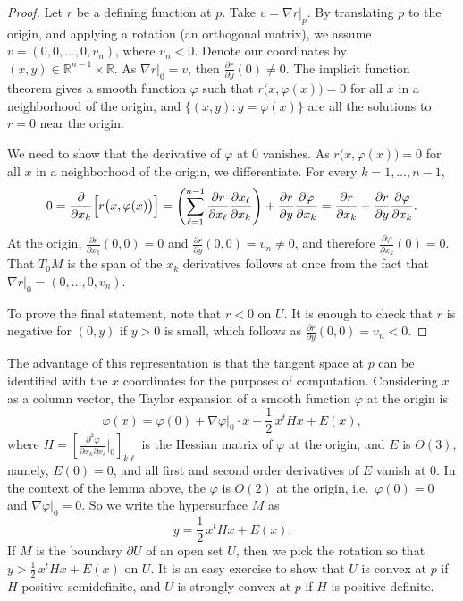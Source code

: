 \documentclass[12pt,openany]{book}
\newcommand{\avoidbreak}{\postdisplaypenalty=100}
\newcommand{\R}{{\mathbb{R}}}
\theoremstyle{plain}
\theoremstyle{remark}
\theoremstyle{definition}
\theoremstyle{exercise}
\theoremstyle{example}
\begin{document}
\begin{proof}
Let $r$ be a defining function at $p$.  Take $v = \nabla r|_p$.
By translating $p$ to the origin, and applying a rotation (an orthogonal matrix),
we assume $v = (0,0,\ldots,0,v_n)$, where $v_n < 0$.  Denote our
coordinates by $(x,y) \in \R^{n-1} \times \R$.  As $\nabla r|_0 =
v$, then $\frac{\partial r}{\partial y}(0) \not= 0$.
The implicit function theorem gives a
smooth function $\varphi$ such that
$r\bigl(x,\varphi(x)\bigr) = 0$ for all $x$ in a neighborhood of the
origin, and $\bigl\{ (x,y) : y=\varphi(x) \bigr\}$ are all the
solutions to $r = 0$ near the origin.

We need to show that the derivative of $\varphi$ at $0$ vanishes.
As
$r\bigl(x,\varphi(x)\bigr) = 0$ for all $x$ in a neighborhood of the
origin, we differentiate.
For every $k=1,\ldots,n-1$,
\begin{equation*}
0 =
\frac{\partial}{\partial x_k} \Bigl[
r\bigl(x,\varphi(x)\bigr)
\Bigr]
=
\left(
\sum_{\ell=1}^{n-1}
\frac{\partial r}{\partial x_\ell}
\frac{\partial x_\ell}{\partial x_k}
\right)
+
\frac{\partial r}{\partial y}
\frac{\partial \varphi}{\partial x_k}
=
\frac{\partial r}{\partial x_k}
+
\frac{\partial r}{\partial y}
\frac{\partial \varphi}{\partial x_k} .
\avoidbreak
\end{equation*}
At the origin,
$\frac{\partial r}{\partial x_k}(0,0) = 0$ and
$\frac{\partial r}{\partial y}(0,0) = v_n \not= 0$, and therefore
$\frac{\partial \varphi}{\partial x_k}(0) = 0$.
That $T_0 M$ is the span of the $x_k$ derivatives
follows at once from the fact that $\nabla r|_0 = (0,\ldots,0,v_n)$.

To prove the final statement, note that
$r < 0$ on $U$.  It is enough to check that $r$ is
negative for $(0,y)$ if $y > 0$ is small, which follows as $\frac{\partial
r}{\partial y}(0,0) = v_n < 0$.
\end{proof}

The advantage of this representation is that the tangent space at $p$
can be identified with the $x$ coordinates for the purposes of computation.
Considering $x$ as a column vector, the Taylor expansion of a smooth function $\varphi$ at the origin is
\begin{equation*}
\varphi(x) = \varphi(0) + \nabla \varphi|_0 \cdot x + \frac{1}{2}\, x^t H x + E(x) ,
\end{equation*}
where $H = \left[
\frac{\partial^2 \varphi}{\partial x_k \partial x_\ell} \big|_{0} \right]_{k\ell}$
is the Hessian matrix of $\varphi$ at the origin,
and $E$ is $O(3)$, namely, $E(0) = 0$, and
all first and second order derivatives of $E$ vanish at $0$.
In the context of the lemma above,
the $\varphi$ is $O(2)$ at the origin, i.e.\ $\varphi(0) = 0$
and $\nabla \varphi|_0 = 0$.  So we write the hypersurface
$M$ as
\begin{equation*}
y = \frac{1}{2}\, x^t H x + E(x) .
\end{equation*}
If $M$ is the boundary
$\partial U$ of an open set $U$, then
we pick the rotation so that $y > \frac{1}{2}\,x^t H x + E(x)$ on $U$.
It is an easy exercise to show that $U$ is convex at $p$ if
$H$ positive semidefinite, and $U$ is strongly convex at $p$ if $H$ is positive definite.
\end{document}
